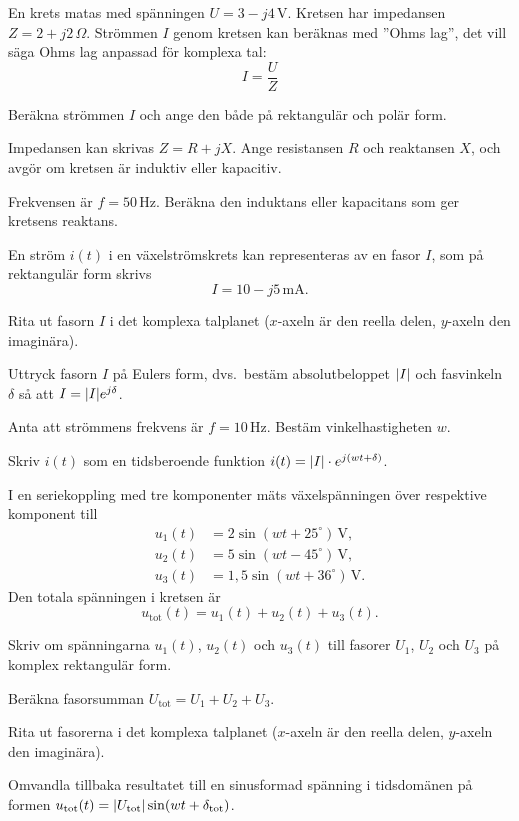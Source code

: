 En krets matas med spänningen $U = 3 - j4\,\text{V}$. Kretsen har impedansen
$Z = 2 + j2\,\Omega$. Strömmen $I$ genom kretsen kan beräknas med ”Ohms lag”, det vill säga Ohms
lag anpassad för komplexa tal:
\[
  I = \frac{U}{Z}
\]
\begin{parts}
  \item Beräkna strömmen $I$ och ange den både på rektangulär och polär form.
  \item Impedansen kan skrivas $Z = R + jX$. Ange resistansen $R$ och reaktansen $X$, och avgör om
    kretsen är induktiv eller kapacitiv.
  \item Frekvensen är $f = 50\,\text{Hz}$. Beräkna den induktans eller kapacitans som ger kretsens
    reaktans.
\end{parts}

En ström $i(t)$ i en växelströmskrets kan representeras av en fasor $I$, som på rektangulär form
skrivs
\[
  I = 10 - j5\,\text{mA}.
\]
\begin{parts}
  \item Rita ut fasorn $I$ i det komplexa talplanet ($x$-axeln är den reella delen, $y$-axeln den
    imaginära).
  \item Uttryck fasorn $I$ på Eulers form, dvs.\ bestäm absolutbeloppet $\lvert I\rvert$ och fasvinkeln
    $\delta$ så att $I = \lvert I\rvert e^{j\delta}$.
  \item Anta att strömmens frekvens är $f = 10\,\text{Hz}$. Bestäm vinkelhastigheten $w$.
  \item Skriv $i(t)$ som en tidsberoende funktion $i(t) = \lvert I\rvert \cdot e^{j(wt + \delta)}$.
\end{parts}

I en seriekoppling med tre komponenter mäts växelspänningen över respektive komponent till
\begin{align*}
  u_1(t) &= 2\sin(wt + 25^{\circ})\,\text{V}, \\
  u_2(t) &= 5\sin(wt - 45^{\circ})\,\text{V}, \\
  u_3(t) &= 1{,}5\sin(wt + 36^{\circ})\,\text{V}.
\end{align*}
Den totala spänningen i kretsen är
\[
  u_{\text{tot}}(t) = u_1(t) + u_2(t) + u_3(t).
\]
\begin{parts}
  \item Skriv om spänningarna $u_1(t)$, $u_2(t)$ och $u_3(t)$ till fasorer $U_1$, $U_2$ och
    $U_3$ på komplex rektangulär form.
  \item Beräkna fasorsumman $U_{\text{tot}} = U_1 + U_2 + U_3$.
  \item Rita ut fasorerna i det komplexa talplanet ($x$-axeln är den reella delen, $y$-axeln den
    imaginära).
  \item Omvandla tillbaka resultatet till en sinusformad spänning i tidsdomänen på formen
    $u_{\text{tot}}(t) = \lvert U_{\text{tot}}\rvert \sin(wt + \delta_{\text{tot}})$.
\end{parts}
